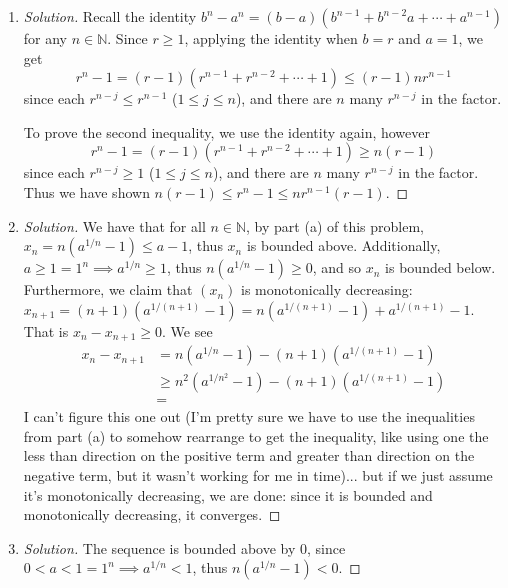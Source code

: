 \documentclass{article}
\newcommand{\N}{{\mathbb N}}
\begin{document}
\begin{enumerate}
	\item \begin{proof}[Solution]\let\qed\relax
		Recall the identity $b^n - a^n =
		(b-a)(b^{n-1} + b^{n-2}a + \cdots + a^{n-1})$
		for any $n \in \N$.
		Since $r \geq 1$,
		applying the identity when $b = r$ and $a = 1$,
		we get
		\[
			r^n - 1 = (r-1)(r^{n-1} + r^{n-2} + \cdots + 1) \leq (r-1)nr^{n-1}
		\]
		since each $r^{n-j} \leq r^{n-1}$ ($1 \leq j \leq n$),
		and there are $n$ many $r^{n-j}$ in the factor. 

		To prove the second inequality,
		we use the identity again,
		however
		\[
			r^n - 1 = (r-1)(r^{n-1} + r^{n-2} + \cdots + 1) \geq n(r-1)
		\]
		since each $r^{n-j} \geq 1$ ($1 \leq j \leq n$),
		and there are $n$ many $r^{n-j}$ in the factor.
		Thus we have shown $n(r-1) \leq r^n - 1 \leq nr^{n-1}(r-1)$.
	\end{proof}
	\item \begin{proof}[Solution]\let\qed\relax
		We have that for all $n \in \N$,
		by part (a) of this problem,
		$x_n = n\left(a^{1/n}-1\right) \leq a - 1$,
		thus $x_n$ is bounded above.
		Additionally, $a \geq 1 = 1^n \implies a^{1/n} \geq 1$,
		thus $n(a^{1/n}-1) \geq 0$, and so $x_n$ is bounded below.
		Furthermore, we claim that $(x_n)$ is monotonically decreasing:
		$x_{n+1} = (n+1)(a^{1/(n+1)} - 1) = n(a^{1/(n+1)} - 1) + a^{1/(n+1)} - 1$. 
		That is $x_n  - x_{n+1} \geq 0$.
		We see
		\begin{align*}
			x_n - x_{n+1}
			&= n\left(a^{1/n} - 1\right) - (n+1)\left(a^{1/(n+1)}-1\right)\\
			&\geq n^2\left(a^{1/n^2} - 1\right) - (n+1)\left(a^{1/(n+1)}-1\right)\\
			&= 
		\end{align*}
		I can't figure this one out
		(I'm pretty sure we have to use the inequalities from part (a)
		to somehow rearrange to get the inequality,
		like using one the less than direction on the positive term
		and greater than direction on the negative term,
		but it wasn't working for me in time)...
		but if we just assume it's monotonically decreasing, we are done:
		since it is bounded and monotonically decreasing,
		it converges.
	\end{proof}
	\item \begin{proof}[Solution]\let\qed\relax
		The sequence is bounded above by $0$,
		since $0 < a < 1 = 1^n \implies a^{1/n} < 1$,
		thus $n(a^{1/n} - 1) < 0$.

\end{proof}
\end{enumerate}
\end{document}
